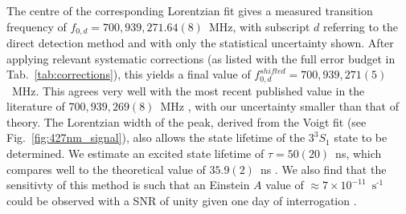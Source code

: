 \documentclass[%
 reprint,
 amsmath,amssymb,
 aps,
 prl,
]{revtex4-2}
\begin{document}
The centre of the corresponding Lorentzian fit gives a measured transition frequency of \(f_{0,d}=700,939,271.64(8)\)~MHz, with subscript \(d\) referring to the direct detection method and with only the statistical uncertainty shown.  After applying relevant systematic corrections (as listed with the full error budget in Tab.~\ref{tab:corrections}), this yields a final value of \(f_{0,d}^{shifted}=700,939,271(5)\)~MHz.  This agrees very well with the most recent published value in the literature of \(700,939,269(8)\)~MHz \cite{Drake2006}, with our uncertainty smaller than that of theory.  The Lorentzian width of the peak, derived from the Voigt fit (see Fig.~\ref{fig:427nm_signal}), also allows the state lifetime of the $3^{3\!}S_1$ state to be determined.  We estimate an excited state lifetime of \(\tau = 50(20)\)~ns, which compares well to the theoretical value of \(35.9(2)\)~ns \cite{SOMs}. We also find that the sensitivty of this method is such that an Einstein \(A\) value of \(\approx 7 \times10^{-11}\)~\(\text{s}^{\text{-}1}\) could be observed with a SNR of unity given one day of interrogation \cite{SOMs}.
\end{document}
